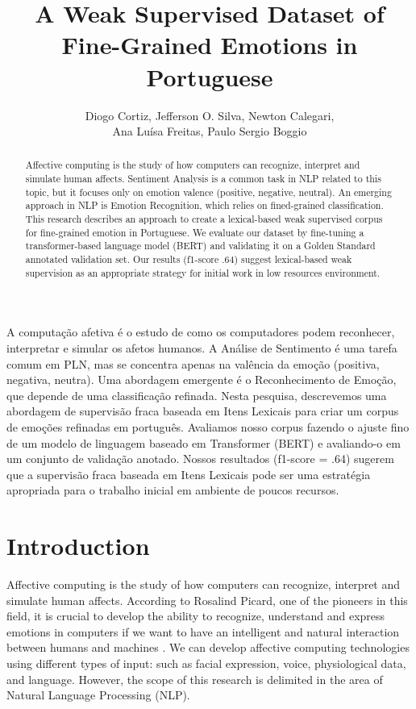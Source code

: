 \documentclass[12pt]{article}
\title{A Weak Supervised Dataset of Fine-Grained Emotions in Portuguese}
\author{Diogo Cortiz\inst{1,2}, Jefferson O. Silva\inst{2}, Newton Calegari\inst{2}, 

Ana Luísa Freitas\inst{3}, Paulo Sergio Boggio\inst{3}}
\begin{document}
\maketitle

\begin{abstract}
Affective computing is the study of how computers can recognize, interpret and simulate human affects. Sentiment Analysis is a common task in NLP related to this topic, but it focuses only on emotion valence (positive, negative, neutral). An emerging approach in NLP is Emotion Recognition, which relies on fined-grained classification. This research describes an approach to create a lexical-based weak supervised corpus for fine-grained emotion in Portuguese. We evaluate our dataset by fine-tuning a transformer-based language model (BERT) and validating it on a Golden Standard annotated validation set. Our results (f1-score .64) suggest lexical-based weak supervision as an appropriate strategy for initial work in low resources environment.
\end{abstract}

\begin{resumo}
A computação afetiva é o estudo de como os computadores podem reconhecer, interpretar e simular os afetos humanos. A Análise de Sentimento é uma tarefa comum em PLN, mas se concentra apenas na valência da emoção (positiva, negativa, neutra). Uma abordagem emergente é o Reconhecimento de Emoção, que depende de uma classificação refinada. Nesta pesquisa, descrevemos uma abordagem de supervisão fraca baseada em Itens Lexicais para criar um corpus de emoções refinadas em português. Avaliamos nosso corpus fazendo o ajuste fino de um modelo de linguagem baseado em Transformer (BERT) e avaliando-o em um conjunto de validação anotado. Nossos resultados (f1-score = .64) sugerem que a supervisão fraca baseada em Itens Lexicais pode ser uma estratégia apropriada para o trabalho inicial em ambiente de poucos recursos.



\end{resumo}


\section{Introduction}
\label{sec:introduction}

Affective computing is the study of how computers can recognize, interpret and simulate human affects. According to Rosalind Picard, one of the pioneers in this field, it is crucial to develop the ability to recognize, understand and express emotions in computers if we want to have an intelligent and natural interaction between humans and machines \cite{Rosalind2000}. We can develop affective computing technologies using different types of input: such as facial expression, voice, physiological data, and language. However, the scope of this research is delimited in the area of Natural Language Processing (NLP).
\end{document}
